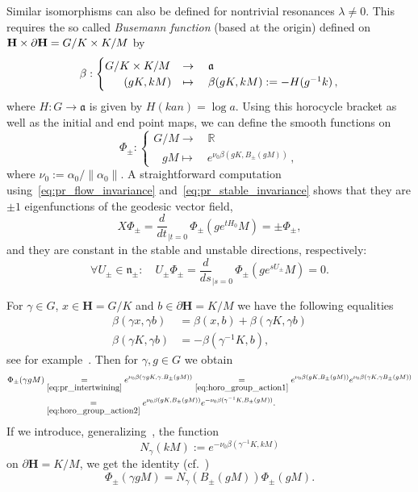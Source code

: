 \documentclass[10pt]{amsart}
\theoremstyle{definition}
\newcommand{\bfh}{\mathbf{H}}
\newcommand{\pl}{\partial}
\newcommand{\x}{\times}
\newcommand{\R}{\mathbb R}
\newcommand{\n}{\mathfrak n}
\renewcommand{\a}{\mathfrak a}
\let\oldforall\forall
\renewcommand*{\forall}{\mathrel{\oldforall}}
\begin{document}
Similar isomorphisms can also be defined for nontrivial resonances $\lambda\neq 0$. This requires the so called \emph{Busemann function} (based at the origin) defined on ${\bfh}\x \pl{\bfh}\linebreak=G/K\times K/M$ by
\begin{equation}\label{eq:def_horocycle}
\beta: 
\begin{cases}
G/K\times K/M & \rightarrow\quad\a \\
\mkern 30mu(gK,kM) & \mapsto\quad\beta(gK,kM) :=-H(g^{-1}k)\,,
\end{cases}
\end{equation}
where $H\colon G\to \mathfrak a$ is given by $H(kan)=\log a$. Using this horocycle bracket as well as the initial and end point maps, we can define the smooth functions on
\begin{equation}\label{eq:def_Phi_pm}
\Phi_{\pm}:
\begin{cases}
G/M \rightarrow\quad\R\\
\;\;\: gM \mapsto\quad e^{\nu_0 \beta(gK,B_\pm(gM))}\,,
\end{cases}
\end{equation}
where $\nu_0:=\alpha_0/\|\alpha_0\|$. A straightforward computation using~\eqref{eq:pr_flow_invariance} and~\eqref{eq:pr_stable_invariance} shows that they are $\pm 1 $ eigenfunctions of the geodesic vector field,
\begin{equation}\label{eq:Phi_pm_flow}
X\Phi_\pm = \frac{d}{dt}_{|t=0}\,\Phi_\pm \left(ge^{tH_0} M\right) = \pm\Phi_\pm,
\end{equation}
and they are constant in the stable and unstable directions, respectively:
\begin{equation}\label{eq:Phi_pm_stab_unstab}
\forall U_\pm\in \n_\pm :\quad U_\pm\Phi_\pm= \frac{d}{ds}_{|s=0}\,\Phi_{\pm}\left(ge^{sU_\pm} M\right) =0.
\end{equation}


For $\gamma\in G$, $x\in {\bfh}=G/K$ and $b\in \pl{\bfh}= K/M$ we have the following equalities
\begin{align}\label{eq:horo_group_action1}
\beta (\gamma x,\gamma b) &= \beta(x,b) + \beta(\gamma K,\gamma b)\\\label{eq:horo_group_action2}
\beta(\gamma K,\gamma b) &= -\beta(\gamma^{-1}K,b),
\end{align}
see for example~\cite[Lemma~2.3]{HHS12}. Then for $\gamma, g \in G$ we obtain
\begin{align*}
\Phi_\pm(\gamma gM) &\underset{\eqref{eq:pr_intertwining}}= e^{\nu_0\beta(\gamma gK,\gamma.B_\pm(gM))}
\underset{\eqref{eq:horo_group_action1}}{=} e^{\nu_0\beta(gK,B_\pm(gM))} e^{\nu_0\beta(\gamma K, \gamma B_\pm(gM))} \\
&\underset{\eqref{eq:horo_group_action2}}{=}e^{\nu_0\beta(gK,B_\pm(gM))} e^{-\nu_0\beta(\gamma^{-1} K, B_\pm(gM))}.
\end{align*}
If we introduce, generalizing~\cite[(3.26)]{DFG15}, the function
\[
N_\gamma(kM) := e^{-\nu_0\beta(\gamma^{-1} K, kM)}
\]
on $\pl{\bfh}=K/M$, we get the identity (cf.~\cite[(3.28)]{DFG15})
\begin{equation}\label{eq:Phi_pm_trafo}
\Phi_\pm(\gamma gM) = N_\gamma(B_\pm(gM))\Phi_\pm(gM).
\end{equation}
\end{document}
